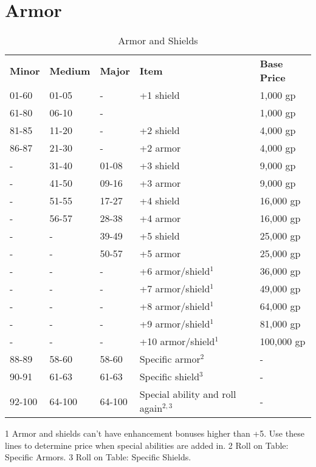 \section{Armor}

\label{f0}
\begin{table}[]
\sffamily
\caption{Armor and Shields}
\begin{tabular}{lllll}
\textbf{Minor} & \textbf{Medium} & \textbf{Major} & \textbf{Item} & \textbf{Base Price}\\
01-60 & 01-05 & - & +1 shield & 1,000 gp\\
61-80 & 06-10 & - &   & 1,000 gp\\
81-85 & 11-20 & -  & +2 shield  & 4,000 gp\\
86-87 & 21-30 & -  & +2 armor  & 4,000 gp\\
- & 31-40 & 01-08  & +3 shield  & 9,000 gp\\
- & 41-50 & 09-16  & +3 armor  & 9,000 gp\\
- & 51-55 & 17-27  & +4 shield  & 16,000 gp\\
- & 56-57 & 28-38  & +4 armor  & 16,000 gp\\
- & - & 39-49  & +5 shield  & 25,000 gp\\
- & - & 50-57  & +5 armor  & 25,000 gp\\
- & - & -  & +6 armor/shield\(^{1}\) & 36,000 gp\\
- & - & -  & +7 armor/shield\(^{1}\) & 49,000 gp\\
- & - & -  & +8 armor/shield\(^{1}\) & 64,000 gp\\
- & - & -  & +9 armor/shield\(^{1}\) & 81,000 gp\\
- & - & -  & +10 armor/shield\(^{1}\) & 100,000 gp\\
88-89 & 58-60  & 58-60  & Specific armor\(^{2}\) & -\\
90-91 & 61-63 &  61-63  & Specific shield\(^{3}\) & -\\
92-100 & 64-100  & 64-100  & Special ability  and roll again\(^{2,3}\) & -\\
\end{tabular}
1 Armor and shields can't have enhancement bonuses higher than +5. Use these lines to determine price when special abilities are added in.
2 Roll on Table: Specific Armors. 
3 Roll on Table: Specific Shields.
\end{table}


